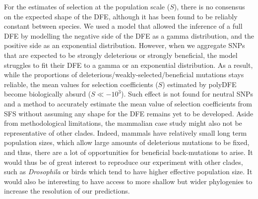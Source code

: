 \documentclass{article}
\newcommand{\Spop}{S}
\begin{document}
    For the estimates of selection at the population scale ($\Spop$), there is no consensus on the expected shape of the DFE\cite{welch_divergence_2008, bataillon_effects_2014}, although it has been found to be reliably constant between species\cite{castellano_comparison_2019}.
    We used a model that allowed the inference of a full DFE by modelling the negative side of the DFE as a gamma distribution, and the positive side as an exponential distribution.
    However, when we aggregate SNPs that are expected to be strongly deleterious or strongly beneficial, the model struggles to fit their DFE to a gamma or an exponential distribution.
    As a result, while the proportions of deleterious/weakly-selected/beneficial mutations stays reliable, the mean values for selection coefficients ($\Spop$) estimated by polyDFE become biologically absurd ($\Spop \ll -10^3$).
    Such effect is not found for neutral SNPs and a method to accurately estimate the mean value of selection coefficients from SFS without assuming any shape for the DFE remains yet to be developed.
    Aside from methodological limitations, the mammalian case study might also not be representative of other clades.
    Indeed, mammals have relatively small long term population sizes, which allow large amounts of deleterious mutations to be fixed, and thus, there are a lot of opportunities for beneficial back-mutations to arise.
    It would thus be of great interest to reproduce our experiment with other clades, such as \textit{Drosophila} or birds which tend to have higher effective population size.
    It would also be interesting to have access to more shallow but wider phylogenies to increase the resolution of our predictions.
\end{document}
